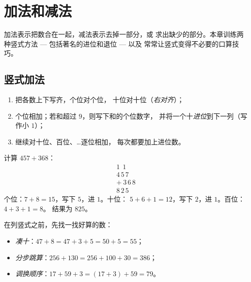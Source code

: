 \chapter{加法和减法}\label{ch:g3:addsub}

加法表示把数合在一起，减法表示去掉一部分，或
求出缺少的部分。本章训练两种竖式方法
--- 包括著名的进位和退位 --- 以及
常常让竖式变得不必要的口算技巧。

\section{竖式加法}

\begin{method}[竖式加法]\label{met:g3:addsub:add}
\begin{enumerate}
  \item 把各数上下写齐，个位对个位，
        十位对十位（\emph{右对齐}）；
  \item 个位相加；若和超过 $9$，则写下和的个位数字，
        并将一个十\emph{进位}到下一列（写作小 $1$）；
  \item 继续对十位、百位、\dots 逐位相加，
        每次都要加上进位数。
\end{enumerate}
\end{method}

\begin{example}\label{ex:g3:addsub:add}
计算 $457 + 368$：
\[
\begin{array}{r}
{\scriptstyle 1}\ \ {\scriptstyle 1}\ \ \phantom{0} \\[-3pt]
4\,5\,7 \\
+\ 3\,6\,8 \\
\hline
8\,2\,5
\end{array}
\]
个位：$7 + 8 = 15$，写下 $5$，进 $1$。十位：
$5 + 6 + 1 = 12$，写下 $2$，进 $1$。百位：$4 + 3 + 1 = 8$。
结果为 $825$。
\end{example}

\begin{example}[口算加法]\label{ex:g3:addsub:mental}
在列竖式之前，先找一找好算的数：
\begin{itemize}
  \item \emph{凑十}：$47 + 8 = 47 + 3 + 5 = 50 + 5 = 55$；
  \item \emph{分步跳算}：$256 + 130 = 256 + 100 + 30 = 386$；
  \item \emph{调换顺序}：$17 + 59 + 3 = (17 + 3) + 59 = 79$。
\end{itemize}
\end{example}

